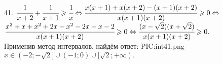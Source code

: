 41. $\cfrac{1}{x+2}+\cfrac{1}{x+1}\geqslant\cfrac{1}{x}\Leftrightarrow \cfrac{x(x+1)+x(x+2)-(x+1)(x+2)}{x(x+1)(x+2)}\geqslant0\Leftrightarrow$\\$
\cfrac{x^2+x+x^2+2x-x^2-2x-x-2}{x(x+1)(x+2)}\geqslant0\Leftrightarrow\cfrac{(x-\sqrt{2})(x+\sqrt{2})}{x(x+1)(x+2)}\geqslant0.$\\ Применив метод интервалов, найдём ответ:
{{PIC:int41.png}}
$x\in(-2;-\sqrt{2}]\cup(-1;0)\cup[\sqrt{2};+\infty).$\newpage\noindent
